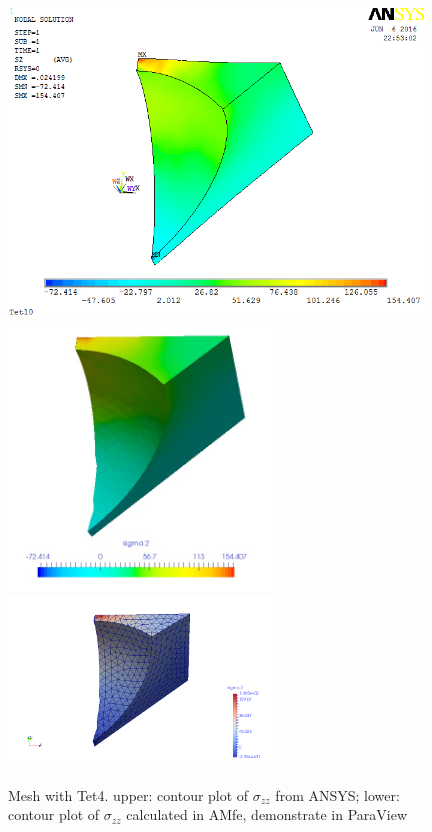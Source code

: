 \begin{figure}[htbp]
	\begin{center}
		\includegraphics[width=11cm,clip]{Tet4Szz.png} 	
		\includegraphics[width=7cm,clip]{Tet4SzzPD.png} 	
		\includegraphics[width=7cm,clip]{Tet4SzzP.png} 		
		\caption{Mesh with Tet4. upper: contour plot of $\sigma_{zz}$ from ANSYS; lower: contour plot of $\sigma_{zz}$ calculated in AMfe, demonstrate in ParaView} \label{fig: Tet4Szz}
	\end{center}
\end{figure}
\clearpage 

